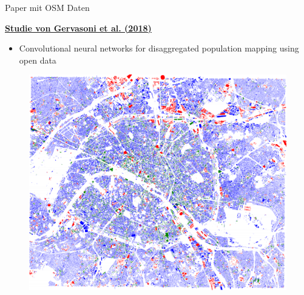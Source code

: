 \documentclass[ignorenonframetext,]{beamer}
\providecommand{\tightlist}{%
  \setlength{\itemsep}{0pt}\setlength{\parskip}{0pt}}
\begin{document}
\begin{frame}{Paper mit OSM Daten}

\begin{block}{\href{https://hal.inria.fr/hal-01852585/document}{\textbf{Studie
von Gervasoni et al. (2018)}}}

\begin{itemize}
\tightlist
\item
  Convolutional neural networks for disaggregated population mapping
  using open data
\end{itemize}

\begin{figure}
\centering
\includegraphics{figure/Buldings_Paris.PNG}
\caption{}
\end{figure}

\end{block}

\end{frame}
\end{document}
